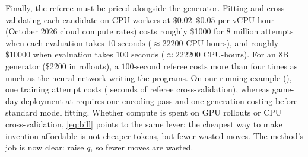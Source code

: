 Finally, the referee must be priced alongside the generator. Fitting and cross-validating each candidate on CPU workers at $\$0.02\text{--}\$0.05$ per vCPU-hour (October 2026 cloud compute rates) costs roughly \$\num{1000} for $8\text{ million}$ attempts when each evaluation takes $10\text{ seconds}$ ($\approx \num{22200}\text{ CPU-hours}$), and roughly \$\num{10000} when evaluation takes $100\text{ seconds}$ ($\approx \num{222200}\text{ CPU-hours}$). For an $8\text{B}$ generator (\$\num{2200} in rollouts), a $100\text{-second}$ referee costs more than four times as much as the neural network writing the programs. On our running example (), one training attempt costs  ( seconds of referee cross-validation), whereas game-day deployment at \searchone{} requires one encoding pass and one generation costing  before standard model fitting. Whether compute is spent on GPU rollouts or CPU cross-validation, \cref{eq:bill} points to the same lever: the cheapest way to make invention affordable is not cheaper tokens, but fewer wasted moves. The method's job is now clear: raise $q$, so fewer moves are wasted.